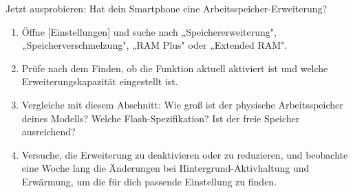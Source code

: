 \begin{tcbpractice}{Jetzt ausprobieren: Hat dein Smartphone eine Arbeitsspeicher-Erweiterung?}
\begin{enumerate}
  \item Öffne [Einstellungen] und suche nach „Speichererweiterung", „Speicherverschmelzung", „RAM Plus" oder „Extended RAM".
  \item Prüfe nach dem Finden, ob die Funktion aktuell aktiviert ist und welche Erweiterungskapazität eingestellt ist.
  \item Vergleiche mit diesem Abschnitt: Wie groß ist der physische Arbeitsspeicher deines Modells? Welche Flash-Spezifikation? Ist der freie Speicher ausreichend?
  \item Versuche, die Erweiterung zu deaktivieren oder zu reduzieren, und beobachte eine Woche lang die Änderungen bei Hintergrund-Aktivhaltung und Erwärmung, um die für dich passende Einstellung zu finden.
\end{enumerate}

\end{tcbpractice}
